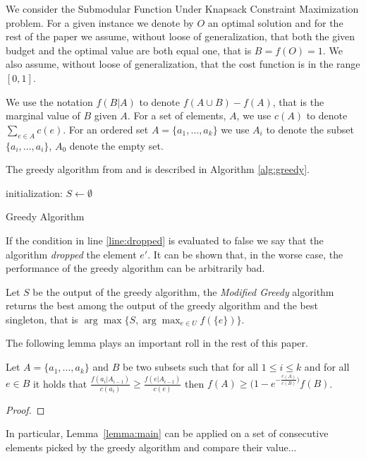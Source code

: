 We consider the Submodular Function Under
Knapsack Constraint Maximization problem.
For a given instance we denote by $O$ an optimal solution and for the rest of the 
paper we assume, without loose of generalization, that both the 
given budget and the optimal value are both equal one, that is $B = f(O) = 1$.
We also assume, without loose of generalization, 
that the cost function is in the range $[0, 1]$.
 
We use the notation $f(B|A)$ to denote $f(A \cup B) - f(A)$, that is the marginal value of $B$
given $A$. 
For a set of elements, $A$, we use $c(A)$ to denote $\sum_{e \in A}c(e)$.
For an ordered set $A = \{a_1, \dots, a_k\}$ we use $A_i$ to denote the subset 
$\{a_i, \dots, a_i\}$, $A_0$ denote the empty set. 

The greedy algorithm from \cite{khuller1999budgeted} and \cite{krause2005note}
is described in Algorithm \ref{alg:greedy}.

\begin{algorithm}[H]
\label{alg:greedy}



initialization: $S \leftarrow \emptyset$
\\
\caption{Greedy Algorithm}
\end{algorithm}
 
If the condition in line \ref{line:dropped} is evaluated to false we say that the algorithm 
\emph{dropped} the element $e'$.
It can be shown that, in the worse case, the performance of the greedy algorithm 
can be arbitrarily bad.

Let $S$ be the output of the greedy algorithm, the \emph{Modified Greedy} algorithm 
returns the best among the output of the greedy algorithm
and the best singleton, that is $\arg\max\{S, \displaystyle{\arg\max_{e \in U}}f(\{e\})\}$.  

The following lemma plays an important roll in the rest of this paper.

\begin{lemma}
\label{lemma:main}
Let $A = \{a_1, \dots, a_k\}$ and $B$ be two subsets such that for all $1 \leq i \leq k$ 
and for all $e \in B$ it holds that 
$\frac{f(a_i|A_{i-1})}{c(a_i)} \geq \frac{f(e|A_{i-1})}{c(e)}$
then $f(A) \geq (1 - e^{-\frac{c(A)}{c(B)})}f(B)$.
\end{lemma} 

\begin{proof}
\end{proof}


In particular, Lemma~\ref{lemma:main} can be applied on a set of consecutive 
elements picked by the greedy algorithm and compare their value...   




